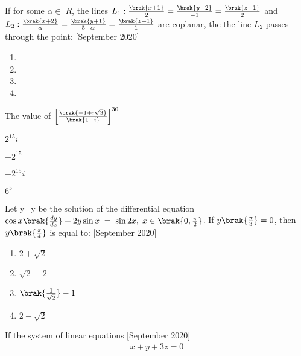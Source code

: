 \iffalse
\title{2020}
\author{EE24BTECH11063}
\section{mcq-single}
\fi
\item If for some $\alpha\in\;R$, the lines $L_1 : \frac{\brak{x+1}}{2}=\frac{\brak{y-2}}{-1}=\frac{\brak{z-1}}{2}$ and $L_2 : \frac{\brak{x+2}}{\alpha}=\frac{\brak{y+1}}{5-\alpha}=\frac{\brak{z+1}}{1}$ are coplanar, the the line $L_2$ passes through the point:  \hfill{[September 2020]}
    \begin{enumerate}
    
        
    
        \item {}
        \item {}
        \item {}
        \item {}
        
        \end{enumerate}
        \item The value of $\left[\frac{\brak{-1+i\sqrt{3}}}{\brak{1-i}}\right]^{30}$
        \begin{enumerate}
        \begin{multicols}{4}
            \item $2^{15}i$
            \item $-2^{15}$
            \item $-2^{15}i$
            \item $6^5$
            \end{multicols}
        \end{enumerate}
\item Let y=y be the solution of the differential equation $\cos{x}\brak{\frac{dy}{dx}}+2y \sin{x}\;=\;\sin{2x},\;x\in\brak{0,\frac{\pi}{2}}$. If $y\brak{\frac{\pi}{3}}=0$, then $y\brak{\frac{\pi}{4}}$ is equal to:  \hfill{[September 2020]}
        \begin{enumerate}
        \item $2+\sqrt{2}$
        \item $\sqrt{2}-2$
        \item $\brak{\frac{1}{\sqrt{2}}}-1$
        \item $2-\sqrt{2}$
        \end{enumerate}
    \item If the system of linear equations \hfill{[September 2020]}
    \begin{align*}
        x+y+3z=0
    \end{align*}
